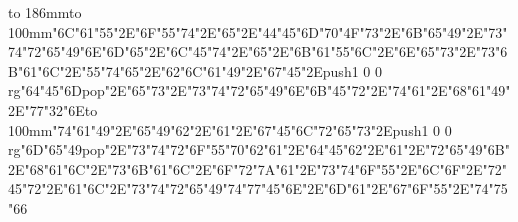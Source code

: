 \hbox to 186mm{\hsize=81mm\vbox to 100mm{\vfill\ipa\char"6C\ipa\char"61\ipa\char"55\ipa\char"2E\ipa\char"6F\ipa\char"55\ipa\char"74\ipa\char"2E\ipa\char"65\ipa\char"2E\ipa\char"44\ipa\char"45\ipa\char"6D\medskip\ipa\char"70\ipa\char"4F\ipa\char"73\ipa\char"2E\ipa\char"6B\ipa\char"65\ipa\char"49\ipa\char"2E\ipa\char"73\ipa\char"74\ipa\char"72\ipa\char"65\ipa\char"49\ipa\char"6E\medskip\ipa\char"6D\ipa\char"65\ipa\char"2E\ipa\char"6C\ipa\char"45\ipa\char"74\ipa\char"2E\ipa\char"65\ipa\char"2E\ipa\char"6B\ipa\char"61\ipa\char"55\ipa\char"6C\ipa\char"2E\ipa\char"6E\ipa\char"65\ipa\char"73\ipa\char"2E\ipa\char"73\ipa\char"6B\ipa\char"61\ipa\char"6C\ipa\char"2E\ipa\char"55\ipa\char"74\medskip\ipa\char"65\ipa\char"2E\ipa\char"62\ipa\char"6C\ipa\char"61\ipa\char"49\ipa\char"2E\ipa\char"67\ipa\char"45\ipa\char"2E\pdfcolorstack\match push{1 0 0 rg}\ipa\char"64\ipa\char"45\ipa\char"6D\pdfcolorstack\match pop{}\ipa\char"2E\ipa\char"65\ipa\char"73\ipa\char"2E\ipa\char"73\ipa\char"74\ipa\char"72\ipa\char"65\ipa\char"49\ipa\char"6E\medskip\ipa\char"6B\ipa\char"45\ipa\char"72\ipa\char"2E\ipa\char"74\ipa\char"61\ipa\char"2E\ipa\char"68\ipa\char"61\ipa\char"49\ipa\char"2E\ipa\char"77\ipa\char"32\ipa\char"6E\vfill}\hfill\vbox to 100mm{\vfill\ipa\char"74\ipa\char"61\ipa\char"49\ipa\char"2E\ipa\char"65\ipa\char"49\ipa\char"62\ipa\char"2E\ipa\char"61\ipa\char"2E\ipa\char"67\ipa\char"45\ipa\char"6C\medskip\ipa\char"72\ipa\char"65\ipa\char"73\ipa\char"2E\pdfcolorstack\match push{1 0 0 rg}\ipa\char"6D\ipa\char"65\ipa\char"49\pdfcolorstack\match pop{}\ipa\char"2E\ipa\char"73\ipa\char"74\ipa\char"72\ipa\char"6F\ipa\char"55\ipa\char"70\medskip\ipa\char"62\ipa\char"61\ipa\char"2E\ipa\char"64\ipa\char"45\ipa\char"62\ipa\char"2E\ipa\char"61\ipa\char"2E\ipa\char"72\ipa\char"65\ipa\char"49\ipa\char"6B\ipa\char"2E\ipa\char"68\ipa\char"61\ipa\char"6C\ipa\char"2E\ipa\char"73\ipa\char"6B\ipa\char"61\ipa\char"6C\ipa\char"2E\ipa\char"6F\ipa\char"72\ipa\char"7A\medskip\ipa\char"61\ipa\char"2E\ipa\char"73\ipa\char"74\ipa\char"6F\ipa\char"55\ipa\char"2E\ipa\char"6C\ipa\char"6F\ipa\char"2E\ipa\char"72\ipa\char"45\ipa\char"72\ipa\char"2E\ipa\char"61\ipa\char"6C\ipa\char"2E\ipa\char"73\ipa\char"74\ipa\char"72\ipa\char"65\ipa\char"49\ipa\char"74\medskip\ipa\char"77\ipa\char"45\ipa\char"6E\ipa\char"2E\ipa\char"6D\ipa\char"61\ipa\char"2E\ipa\char"67\ipa\char"6F\ipa\char"55\ipa\char"2E\ipa\char"74\ipa\char"75\ipa\char"66\vfill}}\eject

